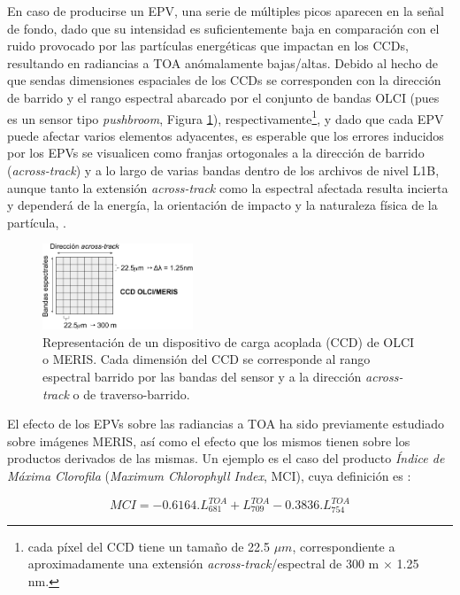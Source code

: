     En caso de producirse un EPV, una serie de múltiples picos aparecen en la señal de fondo, dado que su intensidad es suficientemente baja en comparación con el ruido provocado por las partículas energéticas que impactan en los CCDs, resultando en radiancias a TOA anómalamente bajas/altas. Debido al hecho de que sendas dimensiones espaciales de los CCDs se corresponden con la dirección de barrido y el rango espectral abarcado por el conjunto de bandas OLCI (pues es un sensor tipo \textit{pushbroom}, Figura \ref{ppe:CCD_OLCI}), respectivamente\footnote{cada píxel del CCD tiene un tamaño de 22.5 $\mu m$, correspondiente a aproximadamente una extensión \textit{across-track}/espectral de 300 m $\times$ 1.25 nm.}, y dado que cada EPV puede afectar varios elementos adyacentes, es esperable que los errores inducidos por los EPVs se visualicen como franjas ortogonales a la dirección de barrido (\textit{across-track}) y a lo largo de varias bandas dentro de los archivos de nivel L1B, aunque tanto la extensión \textit{across-track} como la espectral afectada resulta incierta y dependerá de la energía, la orientación de impacto y la naturaleza física de la partícula, \cite{damico2015}.
    
    \begin{figure}
    \includegraphics[width=0.4\textwidth]{ppe/figures/CCD_OLCI.png}
    \caption[Representación de un dispositivo de carga acoplada (CCD) de OLCI o MERIS.]{Representación de un dispositivo de carga acoplada (CCD) de OLCI o MERIS. Cada dimensión del CCD se corresponde al rango espectral barrido por las bandas del sensor y a la dirección \textit{across-track} o de traverso-barrido.}
    \label{ppe:CCD_OLCI}
    \end{figure}
    
    El efecto de los EPVs sobre las radiancias a TOA ha sido previamente estudiado sobre imágenes MERIS, así como el efecto que los mismos tienen sobre los productos derivados de las mismas. Un ejemplo es el caso del producto \textit{Índice de Máxima Clorofila} (\textit{Maximum Chlorophyll Index}, MCI), cuya definición es \cite{gower2008}:
    
    \begin{equation}
    MCI =  -0.6164.L^{TOA}_{681} + L^{TOA}_{709} -0.3836.L^{TOA}_{754}
    \label{ppe:eq:mci}
    \end{equation}
    
